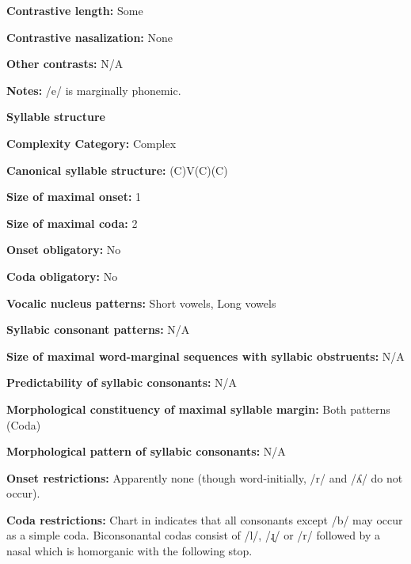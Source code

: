 \textbf{Contrastive length:} Some



\textbf{Contrastive nasalization:} None



\textbf{Other contrasts:} N/A



\textbf{Notes:} /e/ is marginally phonemic.



\textbf{Syllable structure}



\textbf{Complexity Category:} Complex



\textbf{Canonical syllable structure:} (C)V(C)(C) \citep[94-104]{Bowern2012}



\textbf{Size of maximal onset:} 1



\textbf{Size of maximal coda:} 2



\textbf{Onset obligatory:} No



\textbf{Coda obligatory:} No



\textbf{Vocalic nucleus patterns:} Short vowels, Long vowels



\textbf{Syllabic consonant patterns:} N/A



\textbf{Size of maximal word{}-marginal sequences with syllabic obstruents:} N/A



\textbf{Predictability of syllabic consonants:} N/A



\textbf{Morphological constituency of maximal syllable margin:} Both patterns (Coda)



\textbf{Morphological pattern of syllabic consonants:} N/A



\textbf{Onset restrictions:} Apparently none (though word-initially, /r/ and /ʎ/ do not occur).



\textbf{Coda restrictions:} Chart in \citet[102]{Bowern2012} indicates that all consonants except /b/ may occur as a simple coda. Biconsonantal codas consist of /l/, /ɻ/ or /r/ followed by a nasal which is homorganic with the following stop.



